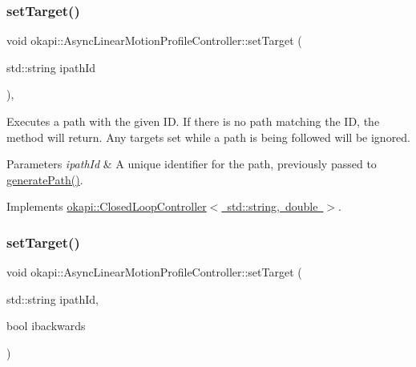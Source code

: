 \subsubsection{\texorpdfstring{setTarget()}{setTarget()}\hspace{0.1cm}{\footnotesize\ttfamily [1/2]}}
{\footnotesize\ttfamily void okapi\+::\+Async\+Linear\+Motion\+Profile\+Controller\+::set\+Target (\begin{DoxyParamCaption}\item[{std\+::string}]{ipath\+Id }\end{DoxyParamCaption})\hspace{0.3cm}{\ttfamily [override]}, {\ttfamily [virtual]}}

Executes a path with the given ID. If there is no path matching the ID, the method will return. Any targets set while a path is being followed will be ignored.


\begin{DoxyParams}{Parameters}
{\em ipath\+Id} & A unique identifier for the path, previously passed to {\ttfamily \mbox{\hyperlink{classokapi_1_1AsyncLinearMotionProfileController_aef2acba51417d929695ca38e309b0f6c}{generate\+Path()}}}. \\
\hline
\end{DoxyParams}


Implements \mbox{\hyperlink{classokapi_1_1ClosedLoopController_ac14482d0768b3f157d52e0214a4c36d7}{okapi\+::\+Closed\+Loop\+Controller$<$ std\+::string, double $>$}}.

\mbox{\label{classokapi_1_1AsyncLinearMotionProfileController_a7b1aa345da6264a6bd76ab106ade2a56}} 
\subsubsection{\texorpdfstring{setTarget()}{setTarget()}\hspace{0.1cm}{\footnotesize\ttfamily [2/2]}}
{\footnotesize\ttfamily void okapi\+::\+Async\+Linear\+Motion\+Profile\+Controller\+::set\+Target (\begin{DoxyParamCaption}\item[{std\+::string}]{ipath\+Id,  }\item[{bool}]{ibackwards }\end{DoxyParamCaption})}

